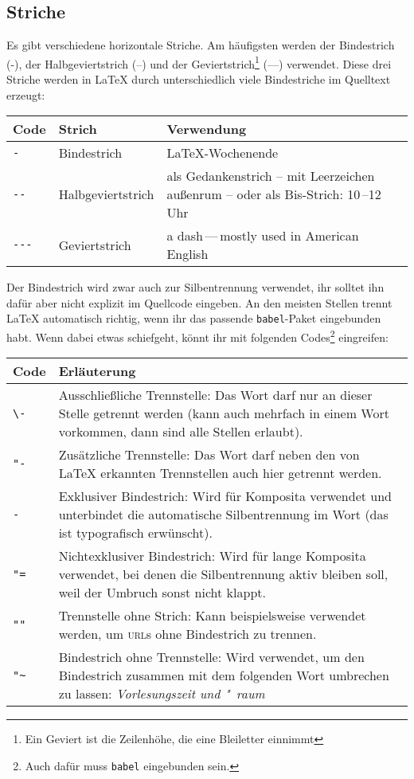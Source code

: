 \subsection{Striche}
Es gibt verschiedene horizontale Striche.
Am häufigsten werden der Bindestrich (-), der Halbgeviertstrich (–) und der Geviertstrich\footnote{Ein Geviert ist die Zeilenhöhe, die eine Bleiletter einnimmt} (—) verwendet.
Diese drei Striche werden in \LaTeX{} durch unterschiedlich viele Bindestriche im Quelltext erzeugt:
\begin{center}
	\begin{longtable}{llp{9cm}}
		\toprule
		Code       & Strich            & Verwendung \\
		\midrule
		\verb|-|   & Bindestrich       & \LaTeX-Wochenende \\
		\verb|--|  & Halbgeviertstrich & als Gedankenstrich – mit Leerzeichen außenrum – oder als Bis-Strich: 10\,–12\,Uhr \\
		\verb|---| & Geviertstrich     & a dash\,—\,mostly used in American English \\
		\bottomrule
	\end{longtable}
\end{center}
Der Bindestrich wird zwar auch zur Silbentrennung verwendet, ihr solltet ihn dafür aber nicht explizit im Quellcode eingeben.
An den meisten Stellen trennt \LaTeX{} automatisch richtig, wenn ihr das passende \texttt{babel}-Paket eingebunden habt.
Wenn dabei etwas schiefgeht, könnt ihr mit folgenden Codes\footnote{Auch dafür muss \texttt{babel} eingebunden sein.} eingreifen:
\begin{center}
	\begin{longtable}{lp{13cm}}
		\toprule
		Code      & Erläuterung \\
		\midrule
		\endhead
		\verb|\-| & Ausschließliche Trennstelle: Das Wort darf nur an dieser Stelle getrennt werden (kann auch mehrfach in einem Wort vorkommen, dann sind alle Stellen erlaubt). \\
		\verb|"-| & Zusätzliche Trennstelle: Das Wort darf neben den von \LaTeX{} erkannten Trennstellen auch hier getrennt werden. \\
		\verb|-|  & Exklusiver Bindestrich: Wird für Komposita verwendet und unterbindet die automatische Silbentrennung im Wort (das ist typografisch erwünscht). \\
		\verb|"=| & Nichtexklusiver Bindestrich: Wird für lange Komposita verwendet, bei denen die Silbentrennung aktiv bleiben soll, weil der Umbruch sonst nicht klappt. \\
		\verb|""| & Trennstelle ohne Strich: Kann beispielsweise verwendet werden, um \textsc{url}s ohne Bindestrich zu trennen. \\
		\verb|"~| & Bindestrich ohne Trennstelle: Wird verwendet, um den Bindestrich zusammen mit dem folgenden Wort umbrechen zu lassen: \emph{Vorlesungszeit und "~raum} \\
		\bottomrule
	\end{longtable}
\end{center}

